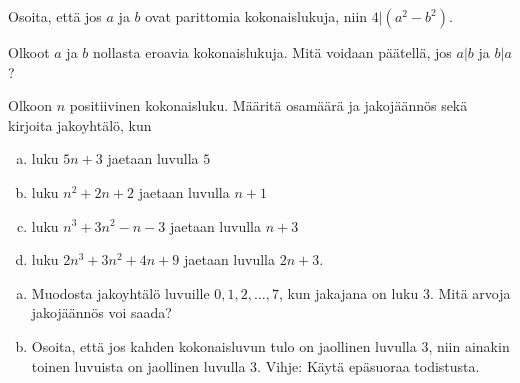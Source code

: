 \begin{tehtavasivu}
\begin{tehtava}
	Osoita, että jos $a$ ja $b$ ovat parittomia kokonaislukuja, niin $4 | (a^2 - b^2)$.
\end{tehtava}

\begin{tehtava}
	Olkoot $a$ ja $b$ nollasta eroavia kokonaislukuja. Mitä voidaan päätellä, jos $a|b$ ja $b|a$?
\end{tehtava}

\begin{tehtava}
	Olkoon $n$ positiivinen kokonaisluku. Määritä osamäärä ja jakojäännös sekä kirjoita jakoyhtälö, kun
	\begin{enumerate}[a)]
	\item luku $5n + 3$ jaetaan luvulla $5$
	\item luku $n^2 + 2n + 2$ jaetaan luvulla $n + 1$
	\item luku $n^3 + 3n^2 - n - 3$ jaetaan luvulla $n + 3$
	\item luku $2n^3 + 3n^2 + 4n + 9$ jaetaan luvulla $2n + 3$.
	\end{enumerate}
\end{tehtava}


\begin{tehtava}
	\begin{enumerate}[a)]
	\item Muodosta jakoyhtälö luvuille $0, 1, 2, \ldots, 7$, kun jakajana on luku $3$. Mitä arvoja jakojäännös voi saada?
	\item Osoita, että jos kahden kokonaisluvun tulo on jaollinen luvulla $3$, niin ainakin toinen luvuista on jaollinen luvulla $3$. Vihje: Käytä epäsuoraa todistusta.
	\end{enumerate}
\end{tehtava}

\end{tehtavasivu}


